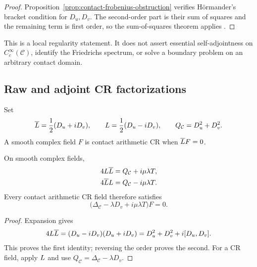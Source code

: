 \begin{proof}
Proposition~\ref{prop:contact-frobenius-obstruction} verifies H\"ormander's bracket
condition for $D_u,D_v$.  The second-order part is their sum of squares and the
remaining term is first order, so the sum-of-squares theorem applies
\cite{Hormander1967Hypoelliptic}.
\end{proof}

\begin{remark}
This is a local regularity statement.  It does not assert essential
self-adjointness on $C_c^\infty(\mathcal C)$, identify the Friedrichs spectrum,
or solve a boundary problem on an arbitrary contact domain.
\end{remark}

\subsection{Raw and adjoint CR factorizations}

\begin{definition}\label{def:contact-cr-operators}
Set
\begin{equation}\label{eq:contact-cr-definition}
 \overline L=\frac12(D_u+iD_v),\qquad
 L=\frac12(D_u-iD_v),\qquad
 Q_{\mathcal C}=D_u^2+D_v^2.
\end{equation}
A smooth complex field $F$ is contact arithmetic CR when $\overline L F=0$.
\end{definition}

\begin{proposition}
\label{prop:contact-raw-cr-factorization}
On smooth complex fields,
\begin{align}
 4L\overline L
   &=Q_{\mathcal C}+i\mu\lambda T,\label{eq:contact-raw-factorization-plus}\\
 4\overline LL
   &=Q_{\mathcal C}-i\mu\lambda T.\label{eq:contact-raw-factorization-minus}
\end{align}
Every contact arithmetic CR field therefore satisfies
\begin{equation}\label{eq:contact-twisted-equation}
 \bigl(\Delta_{\mathcal C}-\lambda D_v+i\mu\lambda T\bigr)F=0.
\end{equation}
\end{proposition}

\begin{proof}
Expansion gives
\[
 4L\overline L=(D_u-iD_v)(D_u+iD_v)
 =D_u^2+D_v^2+i[D_u,D_v].
\]
This proves the first identity; reversing the order proves the second.  For a CR
field, apply $L$ and use
$Q_{\mathcal C}=\Delta_{\mathcal C}-\lambda D_v$.
\end{proof}

